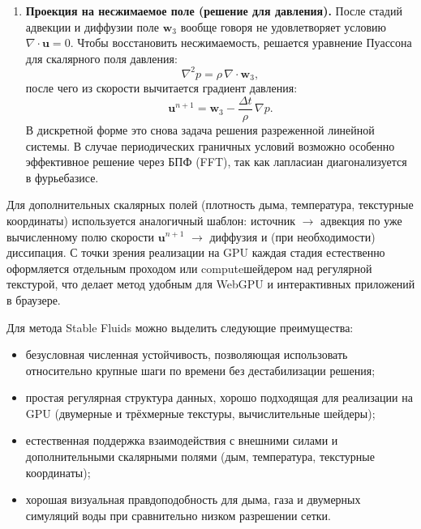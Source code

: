 \begin{enumerate}
      \item \textbf{Проекция на несжимаемое поле (решение для давления).}
            После стадий адвекции и диффузии поле $\mathbf{w}_3$ вообще
            говоря не удовлетворяет условию $\nabla\cdot\mathbf{u}=0$.
            Чтобы восстановить несжимаемость, решается уравнение Пуассона
            для скалярного поля давления:
            \[
                  \nabla^2 p
                  = \rho\,\nabla\cdot\mathbf{w}_3,
            \]
            после чего из скорости вычитается градиент давления:
            \[
                  \mathbf{u}^{n+1}
                  =
                  \mathbf{w}_3
                  - \frac{\Delta t}{\rho}\,\nabla p.
            \]
            В дискретной форме это снова задача решения разреженной
            линейной системы. В случае периодических граничных условий
            возможно особенно эффективное решение через БПФ (FFT), так
            как лапласиан диагонализуется в фурье\textemdash{}базисе.
\end{enumerate}

Для дополнительных скалярных полей (плотность дыма, температура,
текстурные координаты) используется аналогичный шаблон:
источник $\to$ адвекция по уже вычисленному полю скорости
$\mathbf{u}^{n+1}$ $\to$ диффузия и (при необходимости)
диссипация. С точки зрения реализации на GPU каждая стадия
естественно оформляется отдельным проходом или compute\textemdash{}шейдером
над регулярной текстурой, что делает метод удобным для WebGPU
и интерактивных приложений в браузере.

Для метода Stable Fluids можно выделить следующие преимущества:

\begin{itemize}
      \item безусловная численная устойчивость, позволяющая использовать
            относительно крупные шаги по времени без дестабилизации решения;
      \item простая регулярная структура данных, хорошо подходящая
            для реализации на GPU (двумерные и трёхмерные текстуры,
            вычислительные шейдеры);
      \item естественная поддержка взаимодействия с внешними силами
            и дополнительными скалярными полями (дым, температура,
            текстурные координаты);
      \item хорошая визуальная правдоподобность для дыма, газа и
            двумерных симуляций воды при сравнительно низком разрешении
            сетки.
\end{itemize}

